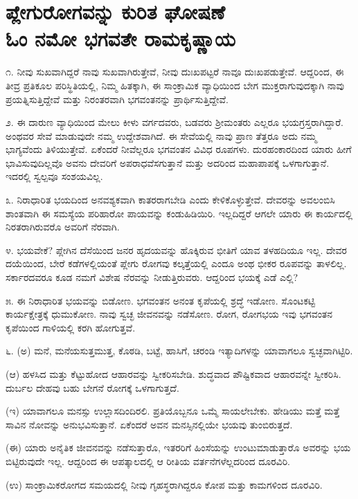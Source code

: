 
\chapter{ಪ್ಲೇಗುರೋಗವನ್ನು ಕುರಿತ ಘೋಷಣೆ\\ಓಂ ನಮೋ ಭಗವತೇ ರಾಮಕೃಷ್ಣಾಯ}

೧. ನೀವು ಸುಖವಾಗಿದ್ದರೆ ನಾವು ಸುಖವಾಗಿರುತ್ತೇವೆ, ನೀವು ದುಃಖಪಟ್ಟರೆ ನಾವೂ ದುಃಖಪಡುತ್ತೇವೆ. ಆದ್ದರಿಂದ, ಈ ತೀವ್ರ ಪ್ರತಿಕೂಲ ಪರಿಸ್ಥಿತಿಯಲ್ಲಿ, ನಿಮ್ಮ ಹಿತಕ್ಕಾಗಿ, ಈ ಸಾಂಕ್ರಾಮಿಕ ವ್ಯಾಧಿಯಿಂದ ಬೇಗ ಮುಕ್ತರಾಗುವುದಕ್ಕಾಗಿ ನಾವು ಪ್ರಯತ್ನಿಸುತ್ತಿದ್ದೇವೆ ಮತ್ತು ನಿರಂತರವಾಗಿ ಭಗವಂತನನ್ನು ಪ್ರಾರ್ಥಿಸುತ್ತಿದ್ದೇವೆ.

೨. ಈ ದಾರುಣ ವ್ಯಾಧಿಯಿಂದ ಮೇಲು ಕೀಳು ವರ್ಗದವರು, ಬಡವರು ಶ‍್ರೀಮಂತರು ಎಲ್ಲರೂ ಭಯಗ್ರಸ್ತರಾಗಿದ್ದಾರೆ. ಅಂಥವರ ಸೇವೆ ಮಾಡುವುದೇ ನಮ್ಮ ಉದ್ದೇಶವಾಗಿದೆ. ಈ ಸೇವೆಯಲ್ಲಿ ನಾವು ಪ್ರಾಣ ತೆತ್ತರೂ ಅದು ನಮ್ಮ ಭಾಗ್ಯವೆಂದು ತಿಳಿಯುತ್ತೇವೆ. ಏಕೆಂದರೆ ನೀವೆಲ್ಲರೂ ಭಗವಂತನ ವಿವಿಧ ರೂಪಗಳು. ದುರಹಂಕಾರದಿಂದ ಯಾರು ಹೀಗೆ ಭಾವಿಸುವುದಿಲ್ಲವೊ ಅವನು ದೇವರಿಗೆ ಅಪರಾಧವೆಸಗುತ್ತಾನೆ ಮತ್ತು ಅದರಿಂದ ಮಹಾಪಾಪಕ್ಕೆ ಒಳಗಾಗುತ್ತಾನೆ. ಇದರಲ್ಲಿ ಸ್ವಲ್ಪವೂ ಸಂಶಯವಿಲ್ಲ.

೩. ನಿರಾಧಾರಿತ ಭಯದಿಂದ ಅನವಶ್ಯಕವಾಗಿ ಕಾತರರಾಗಬೇಡಿ ಎಂದು ಕೇಳಿಕೊಳ್ಳುತ್ತೇವೆ. ದೇವರನ್ನು ಅವಲಂಬಿಸಿ ಶಾಂತವಾಗಿ ಈ ಸಮಸ್ಯೆಯ ಪರಿಹಾರೋ ಪಾಯವನ್ನು ಕಂಡುಹಿಡಿಯಿರಿ. ಇಲ್ಲದಿದ್ದರೆ ಆಗಲೇ ಯಾರು ಈ ಕಾರ್ಯದಲ್ಲಿ ನಿರತರಾಗಿರುವರೊ ಅವರಿಗೆ ನೆರವಾಗಿ.

೪. ಭಯವೇಕೆ? ಪ್ಲೇಗಿನ ದೆಸೆಯಿಂದ ಜನರ ಹೃದಯವನ್ನು ಹೊಕ್ಕಿರುವ ಭೀತಿಗೆ ಯಾವ ತಳಹದಿಯೂ ಇಲ್ಲ. ದೇವರ ದಯೆಯಿಂದ, ಬೇರೆ ಕಡೆಗಳಲ್ಲಿಯಂತೆ ಪ್ಲೇಗು ರೋಗವು ಕಲ್ಕತ್ತೆಯಲ್ಲಿ ಎಂದೂ ಅಂಥ ಭೀಕರ ರೂಪವನ್ನು ತಾಳಲಿಲ್ಲ. ಸರ್ಕಾರದವರೂ ಕೂಡ ನಮಗೆ ವಿಶೇಷ ನೆರವನ್ನು ನೀಡುತ್ತಿರುವರು. ಆದ್ದರಿಂದ ಭಯಕ್ಕೆ ಎಡೆ ಎಲ್ಲಿ?

೫. ಈ ನಿರಾಧಾರಿತ ಭಯವನ್ನು ಬಿಡೋಣ. ಭಗವಂತನ ಅನಂತ ಕೃಪೆಯಲ್ಲಿ ಶ್ರದ್ಧೆ ಇಡೋಣ. ಸೊಂಟಕಟ್ಟಿ ಕಾರ್ಯಕ್ಷೇತ್ರಕ್ಕೆ ಧುಮುಕೋಣ. ನಾವು ಸ್ವಚ್ಛ ಜೀವನವನ್ನು ನಡೆಸೋಣ. ರೋಗ, ರೋಗಭಯ ಇವು ಭಗವಂತನ ಕೃಪೆಯಿಂದ ಗಾಳಿಯಲ್ಲಿ ಕರಗಿ ಹೋಗುತ್ತವೆ.

೬. (ಅ) ಮನೆ, ಮನೆಯಸುತ್ತಮುತ್ತ, ಕೊಠಡಿ, ಬಟ್ಟೆ, ಹಾಸಿಗೆ, ಚರಂಡಿ ಇತ್ಯಾದಿಗಳನ್ನು ಯಾವಾಗಲೂ ಸ್ವಚ್ಛವಾಗಿಟ್ಟಿರಿ.

(ಆ) ಹಳಸಿದ ಮತ್ತು ಕೆಟ್ಟುಹೋದ ಆಹಾರವನ್ನು ಸ್ವೀಕರಿಸಬೇಡಿ. ಶುದ್ಧವಾದ ಪೌಷ್ಟಿಕವಾದ ಆಹಾರವನ್ನೇ ಸ್ವೀಕರಿಸಿ. ದುರ್ಬಲ ದೇಹವು ಬಹು ಬೇಗನೆ ರೋಗಕ್ಕೆ ಒಳಗಾಗುತ್ತದೆ.

(ಇ) ಯಾವಾಗಲೂ ಮನಸ್ಸು ಉಲ್ಲಾಸದಿಂದಿರಲಿ. ಪ್ರತಿಯೊಬ್ಬನೂ ಒಮ್ಮೆ ಸಾಯಲೇಬೇಕು. ಹೇಡಿಯು ಮತ್ತೆ ಮತ್ತೆ ಸಾವಿನ ನೋವನ್ನು ಅನುಭವಿಸುತ್ತಾನೆ. ಏಕೆಂದರೆ ಅವನ ಮನಸ್ಸಿನಲ್ಲಿಯೇ ಭಯವು ತುಂಬಿರುತ್ತದೆ.

(ಈ) ಯಾರು ಅನೈತಿಕ ಜೀವನವನ್ನು ನಡೆಸುತ್ತಾರೊ, ಇತರರಿಗೆ ಹಿಂಸೆಯನ್ನು ಉಂಟುಮಾಡುತ್ತಾರೊ ಅವರನ್ನು ಭಯ ಬಿಟ್ಟಿರುವುದೇ ಇಲ್ಲ. ಆದ್ದರಿಂದ ಈ ಆಪತ್ಕಾಲದಲ್ಲಿ ಆ ರೀತಿಯ ವರ್ತನೆಗಳೆಲ್ಲದರಿಂದ ದೂರವಿರಿ.

(ಉ) ಸಾಂಕ್ರಾಮಿಕರೋಗದ ಸಮಯದಲ್ಲಿ ನೀವು ಗೃಹಸ್ಥರಾಗಿದ್ದರೂ ಕೋಪ ಮತ್ತು ಕಾಮಗಳಿಂದ ದೂರವಿರಿ.

